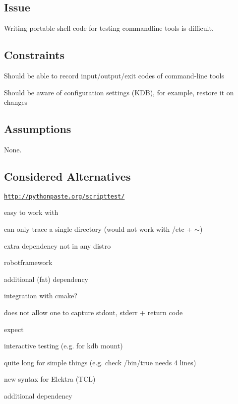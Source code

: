 \subsection*{Issue}

Writing portable shell code for testing commandline tools is difficult.

\subsection*{Constraints}


\begin{DoxyItemize}
\item Should be able to record input/output/exit codes of command-\/line tools
\item Should be aware of configuration settings (K\+DB), for example, restore it on changes
\end{DoxyItemize}

\subsection*{Assumptions}

None.

\subsection*{Considered Alternatives}


\begin{DoxyItemize}
\item \href{http://pythonpaste.org/scripttest/}{\tt http\+://pythonpaste.\+org/scripttest/}
\begin{DoxyItemize}
\item easy to work with
\item can only trace a single directory (would not work with /etc + $\sim$)
\item extra dependency not in any distro
\end{DoxyItemize}
\item robotframework
\begin{DoxyItemize}
\item additional (fat) dependency
\item integration with cmake?
\item does not allow one to capture stdout, stderr + return code
\end{DoxyItemize}
\item expect
\begin{DoxyItemize}
\item interactive testing (e.\+g. for kdb mount)
\item quite long for simple things (e.\+g. check /bin/true needs 4 lines)
\item new syntax for Elektra (T\+CL)
\item additional dependency
\end{DoxyItemize}
\end{DoxyItemize}

